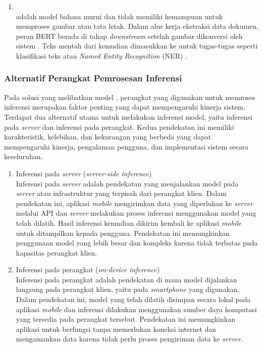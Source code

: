 \begin{enumerate}
    \item \bert{} ~\\
    \bert{} adalah model bahasa murni dan tidak memiliki kemampuan untuk memproses gambar atau tata letak. Dalam alur kerja ekstraksi data dokumen, peran BERT berada di tahap \textit{downstream} setelah gambar dikonversi oleh sistem \ocr. Teks mentah dari \ocr{} kemudian dimasukkan ke \bert{} untuk tugas-tugas \nlp{} seperti klasifikasi teks atau \emph{Named Entity Recognition} (NER) \parencite{koroteev2021bert}. 
\end{enumerate}

\subsubsection{Alternatif Perangkat Pemrosesan Inferensi}
\label{subsubsec:alternatif-perangkat-pemrosesan-inferensi}

Pada solusi yang melibatkan model \ml{}, perangkat yang digunakan untuk memroses inferensi merupakan faktor penting yang dapat mempengaruhi kinerja sistem. Terdapat dua alternatif utama untuk melakukan inferensi model, yaitu inferensi pada \emph{server} dan inferensi pada perangkat. Kedua pendekatan ini memiliki karakteristik, kelebihan, dan kekurangan yang berbeda yang dapat mempengaruhi kinerja, pengalaman pengguna, dan implementasi sistem secara keseluruhan.

\begin{enumerate}
\item Inferensi pada \emph{server} (\emph{server-side inference}) ~\\
Inferensi pada \emph{server} adalah pendekatan yang menjalankan model pada \emph{server} atau infrastruktur yang terpisah dari perangkat klien. Dalam pendekatan ini, aplikasi \emph{mobile} mengirimkan data yang diperlukan ke \emph{server} melalui API dan \emph{server} melakukan proses inferensi menggunakan model yang telah dilatih. Hasil inferensi kemudian dikirim kembali ke aplikasi \emph{mobile} untuk ditampilkan kepada pengguna. Pendekatan ini memungkinkan penggunaan model yang lebih besar dan kompleks karena tidak terbatas pada kapasitas perangkat klien.
\item Inferensi pada perangkat (\emph{on-device inference}) ~\\
Inferensi pada perangkat adalah pendekatan di mana model dijalankan langsung pada perangkat klien, yaitu pada \emph{smartphone} yang digunakan. Dalam pendekatan ini, model yang telah dilatih disimpan secara lokal pada aplikasi \emph{mobile} dan inferensi dilakukan menggunakan sumber daya komputasi yang tersedia pada perangkat tersebut. Pendekatan ini memungkinkan aplikasi untuk berfungsi tanpa memerlukan koneksi internet dan mengamankan data karena tidak perlu proses pengiriman data ke \emph{server}.
\end{enumerate}

